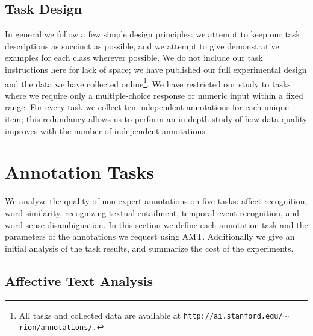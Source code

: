 \documentclass[11pt]{article}
\begin{document}
\subsection{ Task Design }

In general we follow a few simple design principles:  we attempt to keep our task descriptions as succinct as possible, and we attempt to give demonstrative examples for each class wherever possible.  We do not include our task instructions here for lack of space; we have published our full experimental design and the data we have collected online\footnote{All tasks and collected data are available at \texttt{\scriptsize{http://ai.stanford.edu/\ensuremath{\sim}rion/annotations/.}}}.  We have restricted our study to tasks where we require only a multiple-choice response or numeric input within a fixed range. For every task we collect ten independent annotations for each unique item; this redundancy allows us to perform an in-depth study of how data quality improves with the number of independent annotations.


 \vspace*{-0.05in}
\section{ Annotation Tasks }

We analyze the quality of non-expert annotations on five tasks:
affect recognition, word similarity, recognizing textual entailment,
temporal event recognition, and word sense disambiguation. In this
section we define each annotation task and the parameters of the
annotations we request using AMT.  Additionally we give an initial
analysis of the task results, and summarize the cost of the experiments.
\subsection{ Affective Text Analysis }
\end{document}
